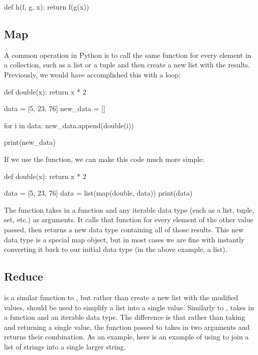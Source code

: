 \documentclass[11pt]{cselabheader}
\begin{document}
\begin{python3code}
def h(f, g, x):
  return f(g(x))
\end{python3code}

\subsection{Map}
\label{subsec:map}
A common operation in Python is to call the same function for every element in a
collection, such as a list or a tuple and then create a new list with the
results. Previously, we would have accomplished this with a 
loop:

\begin{python3code}
def double(x):
    return x * 2

data = [5, 23, 76]
new_data = []

for i in data:
    new_data.append(double(i))

print(new_data)
\end{python3code}

\begin{verbatimcode}
[10, 46, 152]
\end{verbatimcode}

If we use the  function, we can make this code much more simple:

\begin{python3code}
def double(x):
    return x * 2

data = [5, 23, 76]
data = list(map(double, data))
print(data)
\end{python3code}

\begin{verbatimcode}
[10, 46, 152]
\end{verbatimcode}

The  function takes in a function and any iterable data type
(such as a list, tuple, set, etc.) as arguments. It calls that function for
every element of the other value passed, then returns a new data type containing
all of those results. This new data type is a special map object, but in most
cases we are fine with instantly converting it back to our initial data type (in
the above example, a list).


\subsection{Reduce}
\label{subsec:reduce}
 is a similar function to , but rather than
create a new list with the modified values,  should be used to
simplify a list into a single value. Similarly to ,
 takes in a function and an iterable data type. The difference
is that rather than taking and returning a single value, the function passed to
 takes in two arguments and returns their combination. As an
example, here is an example of using  to join a list of
strings into a single larger string.
\end{document}
